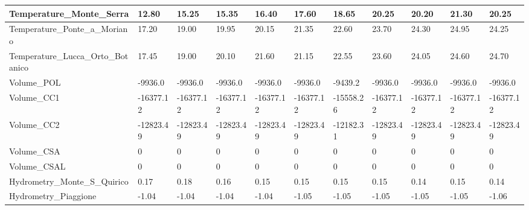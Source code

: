 \documentclass[
]{article}
\begin{document}
\begin{table}
\begin{tabular}[t]{l|l|l|l|l|l|l|l|l|l|l}
\hline
Temperature\_Monte\_Serra & 12.80 & 15.25 & 15.35 & 16.40 & 17.60 & 18.65 & 20.25 & 20.20 & 21.30 & 20.25\\
\hline
Temperature\_Ponte\_a\_Moriano & 17.20 & 19.00 & 19.95 & 20.15 & 21.35 & 22.60 & 23.70 & 24.30 & 24.95 & 24.25\\
\hline
Temperature\_Lucca\_Orto\_Botanico & 17.45 & 19.00 & 20.10 & 21.60 & 21.15 & 22.55 & 23.60 & 24.05 & 24.60 & 24.70\\
\hline
Volume\_POL & -9936.0 & -9936.0 & -9936.0 & -9936.0 & -9936.0 & -9439.2 & -9936.0 & -9936.0 & -9936.0 & -9936.0\\
\hline
Volume\_CC1 & -16377.12 & -16377.12 & -16377.12 & -16377.12 & -16377.12 & -15558.26 & -16377.12 & -16377.12 & -16377.12 & -16377.12\\
\hline
Volume\_CC2 & -12823.49 & -12823.49 & -12823.49 & -12823.49 & -12823.49 & -12182.31 & -12823.49 & -12823.49 & -12823.49 & -12823.49\\
\hline
Volume\_CSA & 0 & 0 & 0 & 0 & 0 & 0 & 0 & 0 & 0 & 0\\
\hline
Volume\_CSAL & 0 & 0 & 0 & 0 & 0 & 0 & 0 & 0 & 0 & 0\\
\hline
Hydrometry\_Monte\_S\_Quirico & 0.17 & 0.18 & 0.16 & 0.15 & 0.15 & 0.15 & 0.15 & 0.14 & 0.15 & 0.14\\
\hline
Hydrometry\_Piaggione & -1.04 & -1.04 & -1.04 & -1.04 & -1.05 & -1.05 & -1.05 & -1.05 & -1.05 & -1.06\\
\hline
\end{tabular}
\end{table}
\end{document}
